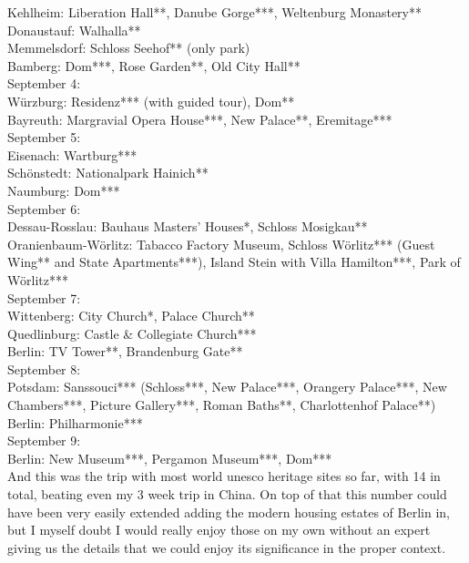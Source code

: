 Kehlheim: Liberation Hall**, Danube Gorge***, Weltenburg Monastery**\\
Donaustauf: Walhalla**\\
Memmelsdorf: Schloss Seehof** (only park)\\
Bamberg: Dom***, Rose Garden**, Old City Hall**\\

September 4:\\
W\"urzburg: Residenz*** (with guided tour), Dom**\\
Bayreuth: Margravial Opera House***, New Palace**, Eremitage***\\

September 5:\\
Eisenach: Wartburg***\\
Sch\"onstedt: Nationalpark Hainich**\\
Naumburg: Dom***\\

September 6:\\
Dessau-Rosslau: Bauhaus Masters' Houses*, Schloss Mosigkau**\\
Oranienbaum-W\"orlitz: Tabacco Factory Museum, Schloss W\"orlitz*** (Guest Wing** and State Apartments***), Island Stein with Villa Hamilton***, Park of W\"orlitz***\\

September 7:\\
Wittenberg: City Church*, Palace Church**\\
Quedlinburg: Castle \& Collegiate Church***\\
Berlin: TV Tower**, Brandenburg Gate**\\

September 8:\\
Potsdam: Sanssouci*** (Schloss***, New Palace***, Orangery Palace***, New Chambers***, Picture Gallery***, Roman Baths**, Charlottenhof Palace**)\\
Berlin: Philharmonie***\\

September 9:\\
Berlin: New Museum***, Pergamon Museum***, Dom***\\

And this was the trip with most world unesco heritage sites so far, with 14 in total, beating even my 3 week trip in China. On top of that this number could have been very easily extended adding the modern housing estates of Berlin in, but I myself doubt I would really enjoy those on my own without an expert giving us the details that we could enjoy its significance in the proper context.\\

